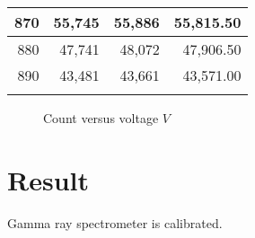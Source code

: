 \begin{longtable}{|r|r|r|r|}
		870                                                                                                                   & 55,745                                               & 55,886                                               & 55,815.50                                                                                                              \\ \hline
		880                                                                                                                   & 47,741                                               & 48,072                                               & 47,906.50                                                                                                              \\ \hline
		890                                                                                                                   & 43,481                                               & 43,661                                               & 43,571.00                                                                                                              \\ \hline
	\caption{}
	\label{tab:grs-table}
	\end{longtable}
%
	\begin{figure}[H]
		\centering
		\caption{Count versus voltage $ V $}
		\label{fig:grs-plot}
	\end{figure}

\section{Result}

Gamma ray spectrometer is calibrated.


